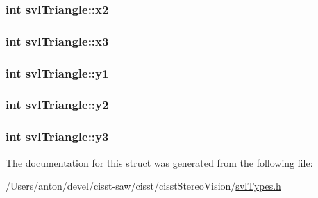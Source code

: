 \subsubsection[{x2}]{\setlength{\rightskip}{0pt plus 5cm}int svl\+Triangle\+::x2}\label{structsvl_triangle_a0d54bb4e6b2a9a776c7934f98ab615f2}
\hypertarget{structsvl_triangle_a55e31484afa1dd95b65fed71acd32798}{}
\subsubsection[{x3}]{\setlength{\rightskip}{0pt plus 5cm}int svl\+Triangle\+::x3}\label{structsvl_triangle_a55e31484afa1dd95b65fed71acd32798}
\hypertarget{structsvl_triangle_a8d2d2e3a7518fbe2dd54ae83295a5564}{}
\subsubsection[{y1}]{\setlength{\rightskip}{0pt plus 5cm}int svl\+Triangle\+::y1}\label{structsvl_triangle_a8d2d2e3a7518fbe2dd54ae83295a5564}
\hypertarget{structsvl_triangle_a5b846c983e7fb8778b41310ecccb31d6}{}
\subsubsection[{y2}]{\setlength{\rightskip}{0pt plus 5cm}int svl\+Triangle\+::y2}\label{structsvl_triangle_a5b846c983e7fb8778b41310ecccb31d6}
\hypertarget{structsvl_triangle_ac077e0223f63837cc3d6013935141db6}{}
\subsubsection[{y3}]{\setlength{\rightskip}{0pt plus 5cm}int svl\+Triangle\+::y3}\label{structsvl_triangle_ac077e0223f63837cc3d6013935141db6}


The documentation for this struct was generated from the following file\+:\begin{DoxyCompactItemize}
\item 
/\+Users/anton/devel/cisst-\/saw/cisst/cisst\+Stereo\+Vision/\hyperlink{svl_types_8h}{svl\+Types.\+h}\end{DoxyCompactItemize}
